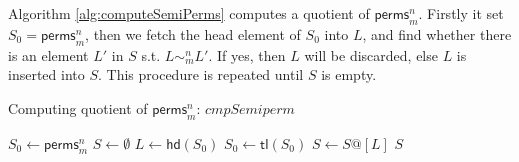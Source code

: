 \documentclass{llncs}
\begin{document}
Algorithm \ref{alg:computeSemiPerms} computes a quotient of $\mathsf{perms}_{m}^{n}$.   Firstly it set $S_0=\mathsf{perms}_m^n$,  then we fetch the head element of $S_0$ into $L$, and find whether there is an element $L'$ in $S$ s.t. $L\sim_m^n L'$. If  yes, then $L$ will be discarded, else $L$ is inserted into $S$. This procedure is repeated until $S$ is empty.


\begin{algorithm}\label{alg:computeSemiPerms}
\caption{Computing quotient of $\mathsf{perms}_{m}^{n}$: $cmpSemiperm$}%



{%



    $S_0\leftarrow \mathsf{perms}_m^n$\;
     $S\leftarrow \emptyset $\;
      {$L \leftarrow \mathsf{hd}(S_0)$\;
       $S_0 \leftarrow \mathsf{tl}(S_0)$\;
        { $S\leftarrow S@[L]$\;}
      }
    \Return $S$\;
}

\end{algorithm}
\end{document}
